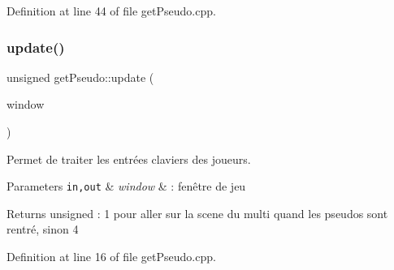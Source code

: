 Definition at line 44 of file get\+Pseudo.\+cpp.

\mbox{\label{namespaceget_pseudo_a16ca01380e0e64dfd93ca957ed916d79}} 
\subsubsection{\texorpdfstring{update()}{update()}}
{\footnotesize\ttfamily unsigned get\+Pseudo\+::update (\begin{DoxyParamCaption}\item[{\hyperlink{class_min_g_l}{Min\+GL} \&}]{window }\end{DoxyParamCaption})}



Permet de traiter les entrées claviers des joueurs. 


\begin{DoxyParams}[1]{Parameters}
\mbox{\tt in,out}  & {\em window} & \+: fenêtre de jeu \\
\hline
\end{DoxyParams}
\begin{DoxyReturn}{Returns}
unsigned \+: 1 pour aller sur la scene du multi quand les pseudos sont rentré, sinon 4 
\end{DoxyReturn}


Definition at line 16 of file get\+Pseudo.\+cpp.

